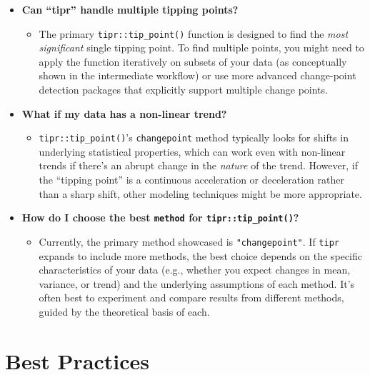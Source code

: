 \documentclass[
  10pt,
  letterpaper,
  DIV=11,
  numbers=noendperiod]{scrartcl}
\providecommand{\tightlist}{%
  \setlength{\itemsep}{0pt}\setlength{\parskip}{0pt}}
\begin{document}
\begin{itemize}
\tightlist
\item
  \textbf{Can ``tipr'' handle multiple tipping points?}

  \begin{itemize}
  \tightlist
  \item
    The primary \texttt{tipr::tip\_point()} function is designed to find
    the \emph{most significant} single tipping point. To find multiple
    points, you might need to apply the function iteratively on subsets
    of your data (as conceptually shown in the intermediate workflow) or
    use more advanced change-point detection packages that explicitly
    support multiple change points.
  \end{itemize}
\item
  \textbf{What if my data has a non-linear trend?}

  \begin{itemize}
  \tightlist
  \item
    \texttt{tipr::tip\_point()}'s \texttt{changepoint} method typically
    looks for shifts in underlying statistical properties, which can
    work even with non-linear trends if there's an abrupt change in the
    \emph{nature} of the trend. However, if the ``tipping point'' is a
    continuous acceleration or deceleration rather than a sharp shift,
    other modeling techniques might be more appropriate.
  \end{itemize}
\item
  \textbf{How do I choose the best \texttt{method} for
  \texttt{tipr::tip\_point()}?}

  \begin{itemize}
  \tightlist
  \item
    Currently, the primary method showcased is \texttt{"changepoint"}.
    If \texttt{tipr} expands to include more methods, the best choice
    depends on the specific characteristics of your data (e.g., whether
    you expect changes in mean, variance, or trend) and the underlying
    assumptions of each method. It's often best to experiment and
    compare results from different methods, guided by the theoretical
    basis of each.
  \end{itemize}
\end{itemize}

\section{Best Practices}\label{best-practices}
\end{document}
